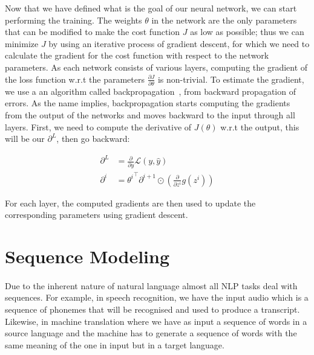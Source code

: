 Now that we have defined what is the goal of our neural network, we can start performing the training. %
The weights $\theta$ in the network are the only parameters that can be modified to make the cost function $J$ as low as possible; thus we can minimize $J$ by using an iterative process of gradient descent, for which we need to calculate the gradient for the cost function with respect to the network parameters.  As each network consists of various layers, computing the gradient of the loss function w.r.t the parameters $\frac{\partial J}{\partial \theta}$ is non-trivial. To estimate the gradient, we use a an algorithm called backpropagation~\citep{rumelhart1988learning}, from backward propagation of errors. As the name implies, backpropagation starts computing the gradients from the output of the networks and moves backward to the input through all layers. First, we need to compute the derivative of $J(\theta)$ w.r.t the output, this will be our $\partial^{L}$, then go backward:




\begin{equation}
\begin{split}
    \partial^{L} & = \frac{\partial}{\partial y} \mathcal{L}(y, \hat{y}) \\
    \partial^i &= {\theta^{i}}^\intercal \partial^{i+1} \odot \left(\frac{\partial}{\partial z^{i}} g(z^i)\right)
\end{split}
\label{eq:backpropagation}    
\end{equation}

For each layer, the computed gradients are then used to update the corresponding parameters using gradient descent.

\section{Sequence Modeling}
\label{sec:sequence_modeling}


\paragraph{}
Due to the inherent nature of natural language almost all NLP tasks deal with sequences. For example, in speech recognition, we have the input audio which is a sequence of phonemes that will be recognised and used to produce a transcript. Likewise, in machine translation where we have as input a sequence of words in a source language and the machine has to generate a sequence of words with the same meaning of the one in input but in a target language.


